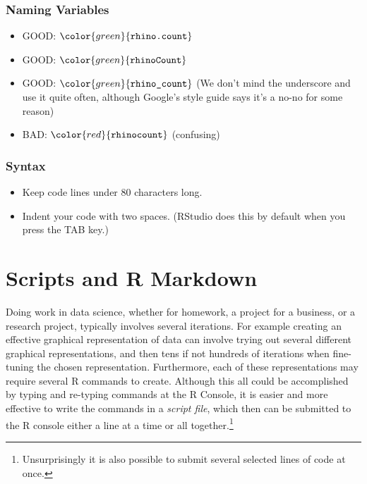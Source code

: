 \documentclass[]{krantz}
\providecommand{\tightlist}{%
  \setlength{\itemsep}{0pt}\setlength{\parskip}{0pt}}
\begin{document}
\subsection{Naming Variables}\label{naming-variables}

\begin{itemize}
\tightlist
\item
  GOOD: \(\color{green}{\verb+rhino.count+}\)
\item
  GOOD: \(\color{green}{\verb+rhinoCount+}\)
\item
  GOOD: \(\color{green}{\verb+rhino_count+}\) (We don't mind the
  underscore and use it quite often, although Google's style guide says
  it's a no-no for some reason)
\item
  BAD: \(\color{red}{\verb+rhinocount+}\) (confusing)
\end{itemize}

\subsection{Syntax}\label{syntax}

\begin{itemize}
\tightlist
\item
  Keep code lines under 80 characters long.
\item
  Indent your code with two spaces. (RStudio does this by default when
  you press the TAB key.)
\end{itemize}

\chapter{Scripts and R Markdown}\label{scripts-and-r-markdown}

Doing work in data science, whether for homework, a project for a
business, or a research project, typically involves several iterations.
For example creating an effective graphical representation of data can
involve trying out several different graphical representations, and then
tens if not hundreds of iterations when fine-tuning the chosen
representation. Furthermore, each of these representations may require
several R commands to create. Although this all could be accomplished by
typing and re-typing commands at the R Console, it is easier and more
effective to write the commands in a \emph{script file}, which then can
be submitted to the R console either a line at a time or all
together.\footnote{Unsurprisingly it is also possible to submit several
  selected lines of code at once.}
\end{document}
